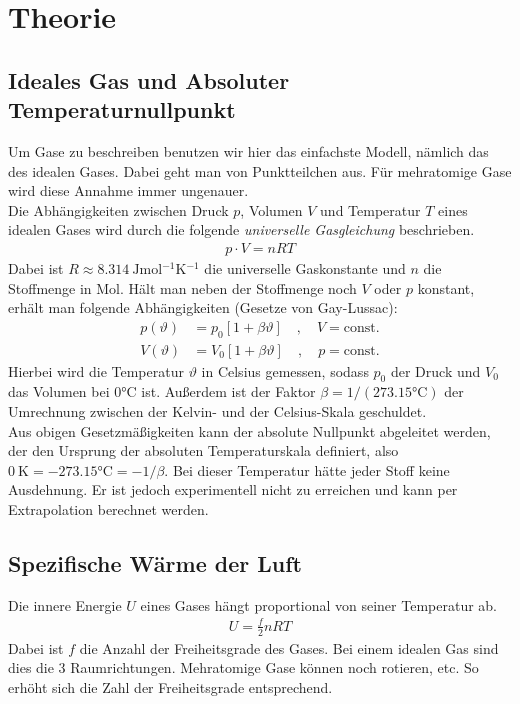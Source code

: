 \documentclass[12pt,a4paper,titlepage,headinclude,bibtotoc]{scrartcl}
\begin{document}
\section{Theorie}
\label{sec:theorie}
\subsection{Ideales Gas und Absoluter Temperaturnullpunkt}
Um Gase zu beschreiben benutzen wir hier das einfachste Modell, nämlich das des idealen Gases.
Dabei geht man von Punktteilchen aus.
Für mehratomige Gase wird diese Annahme immer ungenauer.\\
Die Abhängigkeiten zwischen Druck $p$, Volumen $V$ und Temperatur $T$ eines idealen Gases wird durch die folgende \textit{universelle Gasgleichung} beschrieben.
\begin{align}
 p \cdot V = nRT
 \label{eq:uGasGl}
\end{align}
Dabei ist $R\approx 8.314 ~ \si{\joule \mol^{-1} \kelvin^{-1}}$ die universelle Gaskonstante und $n$ die Stoffmenge in Mol.
Hält man neben der Stoffmenge noch $V$ oder $p$ konstant, erhält man folgende Abhängigkeiten (Gesetze von Gay-Lussac):
\begin{align}
	p(\vartheta)&=p_0 [1+\beta\vartheta] \quad, \quad V =\text{const.}\\
	V(\vartheta)&=V_0 [1+\beta\vartheta] \quad, \quad p=\text{const.}
\end{align}
Hierbei wird die Temperatur $\vartheta$ in Celsius gemessen, sodass $p_0$ der Druck und $V_0$ das Volumen bei $0\si{\celsius}$ ist.
Außerdem ist der Faktor $\beta=1/(273.15 \si{\celsius})$ der Umrechnung zwischen der Kelvin- und der Celsius-Skala geschuldet.\\
Aus obigen Gesetzmäßigkeiten kann der absolute Nullpunkt abgeleitet werden, der den Ursprung der absoluten Temperaturskala definiert, also $0~\si{\kelvin}=-273.15 \si{\celsius}=-1/\beta$.
Bei dieser Temperatur hätte jeder Stoff keine Ausdehnung.
Er ist jedoch experimentell nicht zu erreichen und kann per Extrapolation berechnet werden.

\subsection{Spezifische Wärme der Luft}
Die innere Energie $U$ eines Gases hängt proportional von seiner Temperatur ab.
\begin{align}
	U=\frac{f}{2} n R T
\end{align}
Dabei ist $f$ die Anzahl der Freiheitsgrade des Gases.
Bei einem idealen Gas sind dies die 3 Raumrichtungen.
Mehratomige Gase können noch rotieren, etc.
So erhöht sich die Zahl der Freiheitsgrade entsprechend.\\
\end{document}
